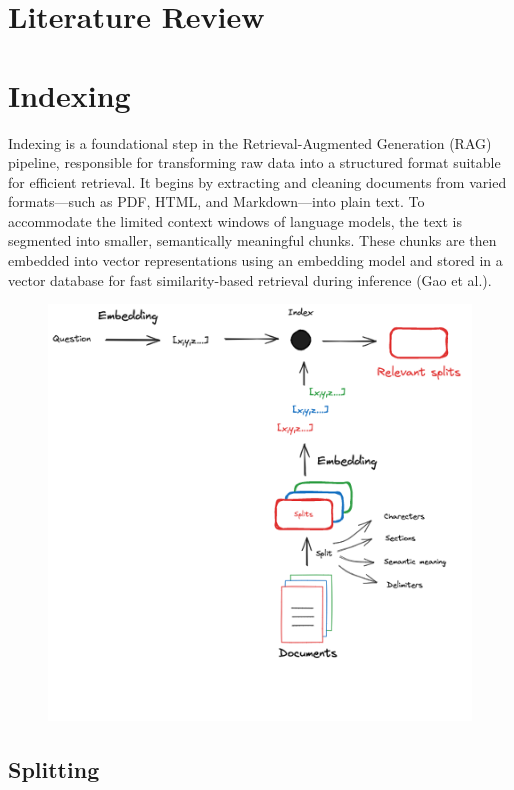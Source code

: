 \documentclass[twocolumn, 10pt]{article}
\begin{document}
\section{Literature Review}


\section{Indexing}

Indexing is a foundational step in the Retrieval-Augmented Generation (RAG) pipeline, responsible for transforming raw data into a structured format suitable for efficient retrieval. It begins by extracting and cleaning documents from varied formats—such as PDF, HTML, and Markdown—into plain text. To accommodate the limited context windows of language models, the text is segmented into smaller, semantically meaningful chunks. These chunks are then embedded into vector representations using an embedding model and stored in a vector database for fast similarity-based retrieval during inference (Gao et al.).

\begin{figure}[H]
    \centering
     \includegraphics[width=\linewidth]{firstimage.jpg}
    \caption{}
    \label{fig:indexing-process}
\end{figure}


\subsection{Splitting}
\end{document}
